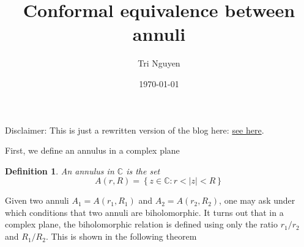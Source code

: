 \documentclass[12pt]{article} %
\title{Conformal equivalence between annuli} %
\author{Tri Nguyen} %
\date{\today} %
\newtheorem{definition}{Definition}
\begin{document}
\maketitle %
Disclaimer: This is just a rewritten version of the blog here:
\href{http://cykenleung.blogspot.com/2012/04/conformal-equivalence-of-annuli.html}{see here}.

First, we define an annulus in a complex plane
\begin{definition}
  An annulus in $\mathbb{C}$ is the set
  \[A(r,R) = \left\lbrace z \in \mathbb{C}: r < |z| <R \right\rbrace\]
\end{definition}
Given two annuli $A_1 = A(r_1, R_1)$ and $A_2 = A(r_2, R_2)$, one may ask under which conditions
that two annuli are biholomorphic. It turns out that in a complex plane, the biholomorphic relation is defined using only
the ratio $r_1/r_2$ and $R_1/R_2$. This is shown in the following theorem
\end{document}
